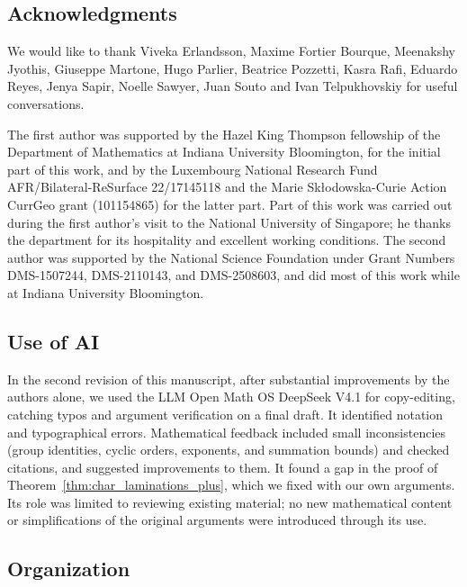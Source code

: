 \subsection{Acknowledgments}
\label{sec:acknowledgments}

We would like to thank Viveka Erlandsson, Maxime Fortier Bourque, Meenakshy Jyothis, Giuseppe Martone, Hugo Parlier, Beatrice Pozzetti, Kasra Rafi, Eduardo Reyes, Jenya Sapir, Noelle Sawyer, Juan Souto and Ivan Tel\-pu\-khov\-skiy for useful conversations.

The first author was supported by the Hazel King Thompson fellowship
of the Department of Mathematics at Indiana University Bloomington,
for the initial part of this work, and by the Luxembourg National
Research Fund AFR/Bilateral-ReSurface 22/17145118 and the Marie
Skłodowska-Curie Action CurrGeo grant (101154865) for the latter part.
Part of this work was carried out during the first author’s visit to
the National University of Singapore; he thanks the department for its
hospitality and excellent working conditions. The second author was
supported by the National Science
Foundation under Grant Numbers DMS-1507244, DMS-2110143, and DMS-2508603, and did
most of this work while at Indiana University Bloomington.

\subsection{Use of AI}

In the second revision of this manuscript, after substantial
improvements by the authors alone,
we used the LLM Open Math OS DeepSeek V4.1
for copy-editing, catching typos and argument verification
on a final draft.
It identified notation and typographical errors.  Mathematical
feedback included
small inconsistencies (group identities, cyclic orders,
exponents, and summation bounds) and
checked citations, and suggested improvements to them.
It found a gap in the proof of
Theorem~\ref{thm:char_laminations_plus}, which we fixed with our own arguments.
Its role was limited to
reviewing existing material; no new mathematical content or
simplifications of the original arguments were introduced through its
use.

\subsection{Organization}
\label{sec:organization}

